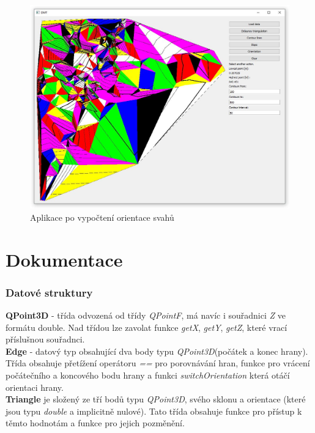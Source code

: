 \documentclass{article}
\begin{document}
\begin{figure}[hp]
\centering
        \includegraphics[trim=0cm 0cm 0cm 0cm, width=1\textwidth]{orientation.jpg}
        \caption{Aplikace po vypočtení orientace svahů}
\end{figure}

\newpage
\section{Dokumentace}

\subsubsection{Datové struktury}
\textbf{QPoint3D} - třída odvozená od třídy \textit{QPointF}, má navíc i souřadnici \textit{Z} ve formátu double. Nad třídou lze zavolat funkce \textit{getX}, \textit{getY}, \textit{getZ}, které vrací příslušnou souřadnci. \\
\textbf{Edge} - datový typ obsahující dva body typu \textit{QPoint3D}(počátek a konec hrany). Třída obsahuje přetížení operátoru \textit{==} pro porovnávání hran, funkce pro vrácení počátečního a koncového bodu hrany a funkci \textit{switchOrientation} která otáčí orientaci hrany. \\
\textbf{Triangle} je složený ze tří bodů typu \textit{QPoint3D}, svého sklonu a orientace (které jsou typu \textit{double} a implicitně nulové). Tato třída obsahuje funkce pro přístup k těmto hodnotám a funkce pro jejich pozměnění. \\
\end{document}
